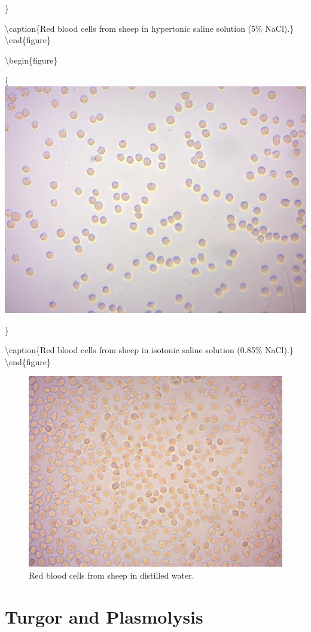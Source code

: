 \}

\textbackslash{}caption\{Red blood cells from sheep in hypertonic saline
solution (5\% NaCl).\}\label{fig:hypertonic} \textbackslash{}end\{figure\}

\textbackslash{}begin\{figure\}

\{\centering \includegraphics[width=0.7\linewidth]{./figures/exchange/blood_isotonic}

\}

\textbackslash{}caption\{Red blood cells from sheep in isotonic saline
solution (0.85\% NaCl).\}\label{fig:isotonic} \textbackslash{}end\{figure\}

\begin{figure}

{\centering \includegraphics[width=0.7\linewidth]{./figures/exchange/blood_hypotonic} 

}

\caption{Red blood cells from sheep in distilled water.}\label{fig:hypotonic}
\end{figure}

\section{Turgor and Plasmolysis}\label{turgor-and-plasmolysis}

